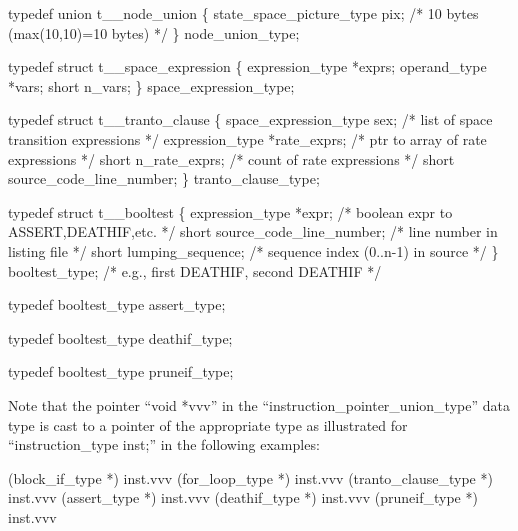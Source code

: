 \begin{codeexample}
typedef union t__node_union
   \{
       state_space_picture_type pix;      /* 10 bytes  (max(10,10)=10 bytes) */
   \} node_union_type;
\end{codeexample}

\begin{codeexample}
typedef struct t__space_expression
   \{
       expression_type *exprs;
       operand_type *vars;
       short n_vars;
   \} space_expression_type;
\end{codeexample}

\begin{codeexample}
typedef struct t__tranto_clause
   \{
       space_expression_type sex;   /* list of space transition expressions */
       expression_type *rate_exprs; /* ptr to array of rate expressions */
       short n_rate_exprs;          /* count of rate expressions */
       short source_code_line_number;
   \} tranto_clause_type;
\end{codeexample}

\begin{codeexample}
typedef struct t__booltest
   \{
       expression_type *expr;         /* boolean expr to ASSERT,DEATHIF,etc. */
       short source_code_line_number; /* line number in listing file */
       short lumping_sequence;        /* sequence index (0..n-1) in source */
   \} booltest_type;                   /* e.g., first DEATHIF, second DEATHIF */
\end{codeexample}

\begin{codeexample}
typedef booltest_type assert_type;
\end{codeexample}

\begin{codeexample}
typedef booltest_type deathif_type;
\end{codeexample}

\begin{codeexample}
typedef booltest_type pruneif_type;
\end{codeexample}


Note that the
pointer ``void *vvv'' in the ``instruction\_pointer\_union\_type'' data type
is cast to a pointer of the appropriate type as
illustrated for ``instruction\_type inst;'' in the following examples:
\begin{codeexample}
(block_if_type *) inst.vvv
(for_loop_type *) inst.vvv
(tranto_clause_type *) inst.vvv
(assert_type *) inst.vvv
(deathif_type *) inst.vvv
(pruneif_type *) inst.vvv
\end{codeexample}

